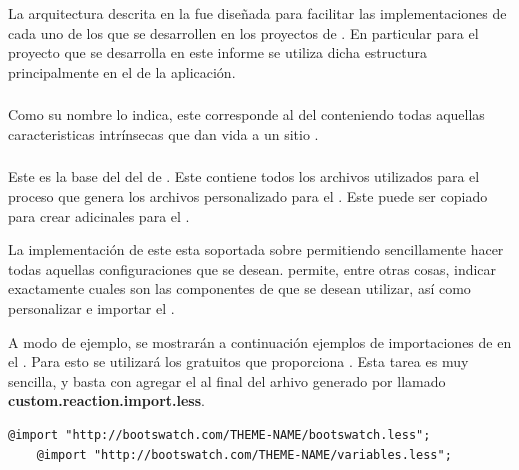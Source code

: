 La arquitectura descrita en la  fue diseñada para facilitar las implementaciones de cada uno de los \packagesAS que se desarrollen en los proyectos de \meteorNAME. En particular para el proyecto que se desarrolla en este informe se utiliza dicha estructura principalmente en el \packagesAS \coreAS de la aplicación.

\subsubsection{\eframeworkCorePCKG}

Como su nombre lo indica, este \packagesAS corresponde al \coreAS del \frameworkPC conteniendo todas aquellas caracteristicas intrínsecas que dan vida a un sitio \ecommerceCOM. 

\subsubsection{\eframeworkCoreThemePCKG}\label{chapter:section:subsection:package_core_theme}

Este \packagesAS es la base del \bootstrap \themeCPT del \frameworkPC de \ecommerceCOM. Este contiene todos los archivos \lessNAME utilizados para el proceso que genera los archivos \lessNAME personalizado para el \frameworkPC. Este \packagesAS puede ser copiado para crear \themeCPT adicinales para el \frameworkPC \ecommerceCOM.

La implementación de este \packagesAS esta soportada sobre \bootstrapPackage permitiendo sencillamente hacer todas aquellas configuraciones que se desean. \bootstrapPackage permite, entre otras cosas, indicar exactamente cuales son las componentes de \bootstrapNAME que se desean utilizar, así como personalizar e importar el \themeCPT.

A modo de ejemplo, se mostrarán a continuación ejemplos de importaciones de \themesCPT en el \frameworkPC. Para esto se utilizará los \themesCPT gratuitos que proporciona \bootswatchNAME. Esta tarea es muy sencilla, y basta con agregar el  al final del arhivo generado por \bootstrapPackage llamado \textbf{custom.reaction.import.less}.

%
\medskip
\begin{lstlisting}[caption= Código genérico para importar \themesCPT desde \bootswatchNAME, label=source:less:generic_bootswatch_theme]
	@import "http://bootswatch.com/THEME-NAME/bootswatch.less";
	@import "http://bootswatch.com/THEME-NAME/variables.less";
\end{lstlisting}

